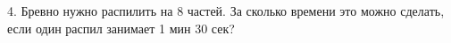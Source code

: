 4. Бревно нужно распилить на 8 частей. За сколько времени это можно сделать, если один распил занимает 1 мин 30 сек?\\
